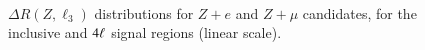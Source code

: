 \begin{figure}[h]
{  }
   \\
  \caption{$\Delta R(Z,\ell_3)$ distributions for $Z+e$ and $Z+\mu$ candidates, for the inclusive and $4\ell$ signal regions (linear scale).}
  \label{fig:SR-dR-1-linear}
\end{figure}

